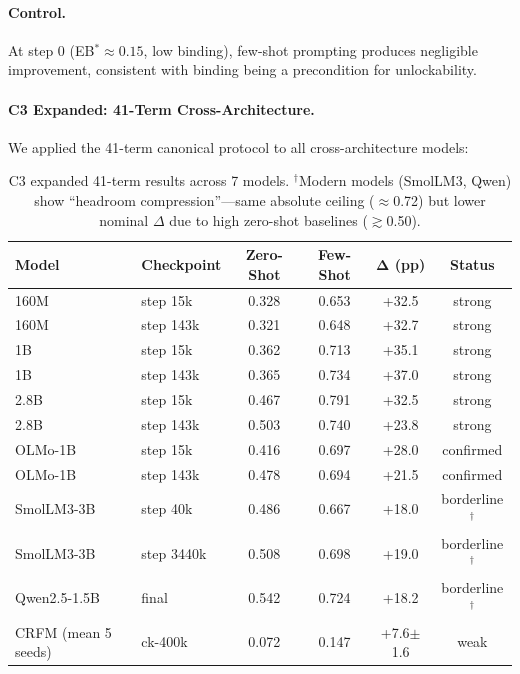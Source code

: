 \documentclass[10pt]{article} %
\begin{document}
\paragraph{Control.}
At step 0 (EB$^*\approx 0.15$, low binding), few-shot prompting produces negligible improvement, consistent with binding being a precondition for unlockability.

\paragraph{C3 Expanded: 41-Term Cross-Architecture.}
We applied the 41-term canonical protocol to all cross-architecture models:

\begin{table}[h]
\centering
\small
\begin{tabular}{|l|l|c|c|c|c|}
\hline
\textbf{Model} & \textbf{Checkpoint} & \textbf{Zero-Shot} & \textbf{Few-Shot} & $\mathbf{\Delta}$ \textbf{(pp)} & \textbf{Status} \\
\hline
160M & step 15k & 0.328 & 0.653 & +32.5 & strong \\
160M & step 143k & 0.321 & 0.648 & +32.7 & strong \\
1B & step 15k & 0.362 & 0.713 & +35.1 & strong \\
1B & step 143k & 0.365 & 0.734 & +37.0 & strong \\
2.8B & step 15k & 0.467 & 0.791 & +32.5 & strong \\
2.8B & step 143k & 0.503 & 0.740 & +23.8 & strong \\
OLMo-1B & step 15k & 0.416 & 0.697 & +28.0 & confirmed \\
OLMo-1B & step 143k & 0.478 & 0.694 & +21.5 & confirmed \\
SmolLM3-3B & step 40k & 0.486 & 0.667 & +18.0 & borderline$^\dagger$ \\
SmolLM3-3B & step 3440k & 0.508 & 0.698 & +19.0 & borderline$^\dagger$ \\
Qwen2.5-1.5B & final & 0.542 & 0.724 & +18.2 & borderline$^\dagger$ \\
CRFM (mean 5 seeds) & ck-400k & 0.072 & 0.147 & +7.6$\pm$1.6 & weak \\
\hline
\end{tabular}
\caption{C3 expanded 41-term results across 7 models. $^\dagger$Modern models (SmolLM3, Qwen) show ``headroom compression''---same absolute ceiling ($\approx$0.72) but lower nominal $\Delta$ due to high zero-shot baselines ($\gtrsim$0.50).}
\label{tab:c3_expanded}
\end{table}
\end{document}
